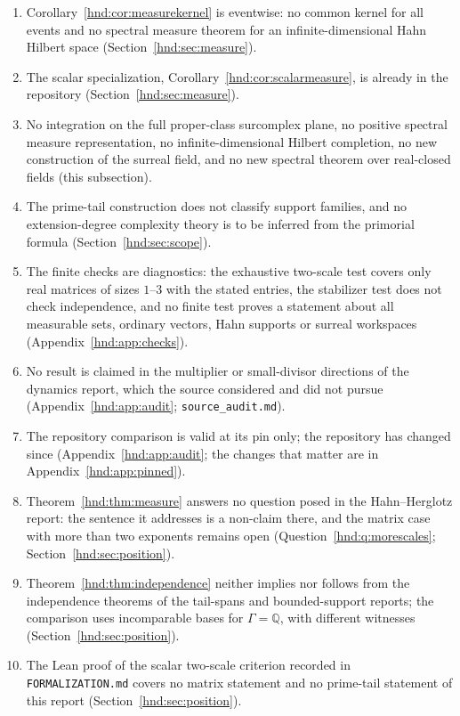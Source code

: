 \documentclass[11pt,oneside]{article}
\theoremstyle{definition}
\theoremstyle{remark}
\newcommand{\Q}{\mathbb Q}
\newcommand{\repo}[1]{\nolinkurl{#1}}%
\begin{document}
\begin{enumerate}[label=\arabic*.,leftmargin=2.2em]
finite test in $u$ (Section~\ref{hnd:sec:measure}).
\item Corollary~\ref{hnd:cor:measurekernel} is eventwise: no common kernel
for all events and no spectral measure theorem for an infinite-dimensional
Hahn Hilbert space (Section~\ref{hnd:sec:measure}).
\item The scalar specialization, Corollary~\ref{hnd:cor:scalarmeasure}, is
already in the repository (Section~\ref{hnd:sec:measure}).
\item No integration on the full proper-class surcomplex plane, no positive
spectral measure representation, no infinite-dimensional Hilbert completion,
no new construction of the surreal field, and no new spectral theorem over
real-closed fields (this subsection).
\item The prime-tail construction does not classify support families, and
no extension-degree complexity theory is to be inferred from the primorial
formula (Section~\ref{hnd:sec:scope}).
\item The finite checks are diagnostics: the exhaustive two-scale test
covers only real matrices of sizes $1$--$3$ with the stated entries, the
stabilizer test does not check independence, and no finite test proves a
statement about all measurable sets, ordinary vectors, Hahn supports or
surreal workspaces (Appendix~\ref{hnd:app:checks}).
\item No result is claimed in the multiplier or small-divisor directions of
the dynamics report, which the source considered and did not pursue
(Appendix~\ref{hnd:app:audit}; \texttt{source\_audit.md}).
\item The repository comparison is valid at its pin only; the repository has
changed since (Appendix~\ref{hnd:app:audit}; the changes that matter are in
Appendix~\ref{hnd:app:pinned}).
\item Theorem~\ref{hnd:thm:measure} answers no question posed in the
Hahn--Herglotz report: the sentence it addresses is a non-claim there, and
the matrix case with more than two exponents remains open
(Question~\ref{hnd:q:morescales}; Section~\ref{hnd:sec:position}).
\item Theorem~\ref{hnd:thm:independence} neither implies nor follows from
the independence theorems of the tail-spans and bounded-support reports;
the comparison uses incomparable bases for $\Gamma=\Q$, with different
witnesses (Section~\ref{hnd:sec:position}).
\item The Lean proof of the scalar two-scale criterion recorded in
\repo{FORMALIZATION.md} covers no matrix statement and no prime-tail
statement of this report (Section~\ref{hnd:sec:position}).
\end{enumerate}
\end{document}
